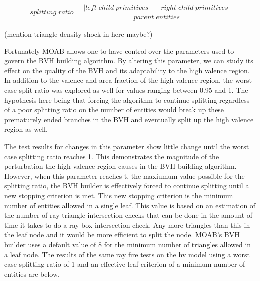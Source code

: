 \documentclass[10pt, a4paper]{article}
\begin{document}
  \begin{align*}
  splitting\;ratio  = \dfrac{|left\; child\; primitives\; -\; right\; child\; primitives|}{parent\; entities}
  \end{align*}

(mention triangle density shock in here maybe?)

  Fortunately MOAB allows one to have control over the parameters used to govern the BVH building algorithm. By altering this parameter, we can study its effect on the quality of the BVH and its adaptability to the high valence region. In addition to the valence and area fraction of the high valence region, the worst case split ratio was explored as well for values ranging between 0.95 and 1. The hypothesis here being that forcing the algorithm to continue splitting regardless of a poor splitting ratio on the number of entities would break up these prematurely ended branches in the BVH and eventually split up the high valence region as well.


  The test results for changes in this parameter show little change until the worst case splitting ratio reaches 1. This demonstrates the magnitude of the  perturbation the high valence region causes in the BVH building algorithm. However, when this parameter reaches t, the maxiumum value possible for the splitting ratio, the BVH builder is effectively forced to continue splitting until a new stopping criterion is met. This new stopping criterion is the minimum number of entities allowed in a single leaf. This value is based on an estimation of the number of ray-triangle intersection checks that can be done in the amount of time it takes to do a ray-box intersection check. Any more triangles than this in the leaf node and it would be more efficient to split the node. MOAB's BVH builder uses a default value of 8 for the minimum number of triangles allowed in a leaf node. The results of the same ray fire tests on the hv model using a worst case splitting ratio of 1 and an effective leaf criterion of a minimum number of entities are below.
\end{document}

